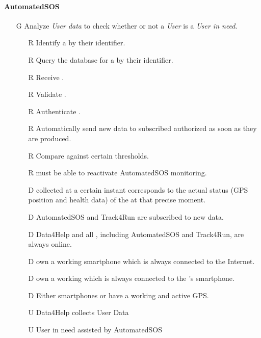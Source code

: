 \documentclass[../../../rasd.tex]{subfiles}
\begin{document}
\paragraph{AutomatedSOS}
\begin{itemize}
    \item[G\subs{6}]Analyze \textit{User data} to check whether or not a \textit{User} is a \textit{User in need}.
    \begin{itemize}
        \item[R\subs{6}]Identify a  by their identifier.
        \item[R\subs{7}]Query the database for a  by their identifier.
        \item[R\subs{8}]Receive .
        \item[R\subs{9}]Validate .
        \item[R\subs{10}]Authenticate .
        \item[R\subs{29}]Automatically send new data to subscribed authorized  as soon as they are produced.
        \item[R\subs{36}]Compare  against certain thresholds.
        \item[R\subs{38}] must be able to reactivate AutomatedSOS monitoring.
        \\
        \item[D\subs{2}] collected at a certain instant corresponds to the actual status (GPS position and health data) of the  at that precise moment.              
        \item[D\subs{6}]AutomatedSOS and Track4Run are subscribed to new data.
        \item[D\subs{9}]Data4Help and all , including AutomatedSOS and Track4Run, are always online.
        \item[D\subs{10}] own a working smartphone which is always connected to the Internet.
        \item[D\subs{11}] own a working  which is always connected to the 's smartphone.
        \item[D\subs{12}]Either smartphones or  have a working and active GPS.
        \\
        \item[U\subs{5}]Data4Help collects User Data
        \item[U\subs{12}]User in need assisted by AutomatedSOS
    \end{itemize}


\end{itemize}
\end{document}

